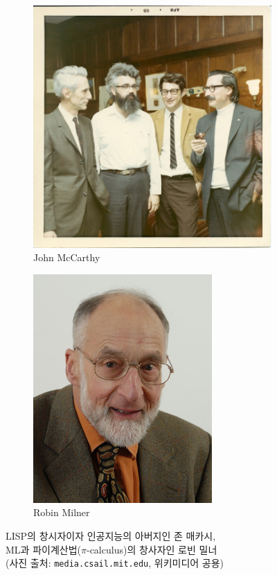 \documentclass[b5paper,chapter,figtabcapt]{oblivoir}
\begin{document}
\begin{figure}\centering
\begin{subfigure}{.3\textwidth}\centering
\includegraphics[trim={200pt 380pt 380pt 175pt},clip,scale=.8]{ShannonMcCarthyFredkinWeizenbaum.jpg}
\caption{John McCarthy}
\end{subfigure}
\qquad\qquad
\begin{subfigure}{.3\textwidth}\centering
\includegraphics[trim={0 20pt 0 0},clip,scale=.8]{RobinMilner.jpg}
\caption{Robin Milner}
\end{subfigure}
\caption{LISP의 창시자이자 인공지능의 아버지인 존 매카시,\\
         ML과 파이계산법($\pi$-calculus)의 창사자인 로빈 밀너\\
         {\footnotesize(사진 출처: \texttt{media.csail.mit.edu},
                        위키미디어 공용)} }
\end{figure}
\end{document}

